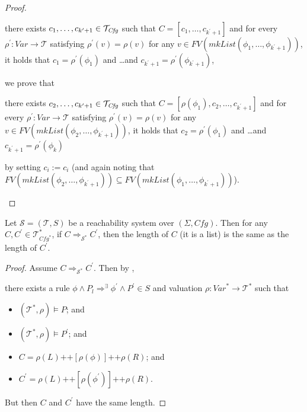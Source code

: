 \begin{proof}
\begin{itemize}
\begin{itemize}
        \begin{proofenv}
        there exists $c_1, \ldots, c_{k^\prime + 1} \in \mathcal{T}_{\mathit{Cfg}}$ such that $C = [c_1, \ldots, c_{k^\prime + 1}]$
        and for every $\rho^\prime : \mathit{Var} \to \mathcal{T}$ satisfying
        $\rho^\prime(v) = \rho(v)$ for any
        $v \in \mathit{FV}(\mathit{mkList}(\phi_1, \ldots, \phi_{k^\prime + 1}))$,
        it holds that
        $c_1 = \rho^\prime(\phi_1)$ and \ldots and $c_{k^\prime + 1} = \rho^\prime(\phi_{k^\prime + 1})$,
        \end{proofenv}
        we prove that
        \begin{proofenv}
        there exists $c_2, \ldots, c_{k^\prime + 1} \in \mathcal{T}_{\mathit{Cfg}}$ such that
        $C = [\rho(\phi_1), c_2, \ldots, c_{k^\prime+1}]$
        and for every $\rho^\prime : \mathit{Var} \to \mathcal{T}$ satisfying
        $\rho^\prime(v) = \rho(v)$ for any
        $v \in \mathit{FV}(\mathit{mkList}(\phi_2, \ldots, \phi_{k^\prime+1}))$,
        it holds that
        $c_2 = \rho^\prime(\phi_1)$ and \ldots and $c_{k^\prime+1} = \rho^\prime(\phi_k)$
        \end{proofenv}
        by setting $c_i := c_i$
        (and again noting that $\mathit{FV}(\mathit{mkList}(\phi_2,\ldots,\phi_{k^\prime+1})) \subseteq \mathit{FV}(\mathit{mkList}(\phi_1,\ldots,\phi_{k^\prime+1}))$).
    \end{itemize}
\end{itemize}
\end{proof}

\begin{lemma}\label{lem:transitionOnlyBetweenListsOfSameLength}
    Let $\mathcal{S} = (\mathcal{T}, S)$ be a reachability system over $(\Sigma, \mathit{Cfg})$.
    Then for any $C,C^\prime \in \mathcal{T}^*_{\mathit{Cfg}^*}$,
    if $C \Rightarrow_{\mathcal{S}^*} C^\prime$,
    then the length of $C$ (it is a list) is the same as the length of $C^\prime$.
\end{lemma}
\begin{proof}
Assume $C \Rightarrow_{\mathcal{S}^*} C^\prime$.
Then by ,
\begin{proofenv}
    there exists a rule $\phi \land P_l \Rightarrow^\exists \phi^\prime \land P^\prime \in S$
    and valuation $\rho : \mathit{Var}^* \to \mathcal{T}^*$ such that
    \begin{itemize}
        \item $(\mathcal{T}^*, \rho) \vDash P$; and
        \item $(\mathcal{T}^*, \rho) \vDash P^\prime$; and
        \item $C = \rho(L) \texttt{++} [\rho(\phi)] \texttt{++} \rho(R)$; and
        \item $C^\prime = \rho(L) \texttt{++} [\rho(\phi^\prime)] 
        \texttt{++} \rho(R)$.
    \end{itemize}
\end{proofenv}
But then $C$ and $C^\prime$ have the same length.
\end{proof}

